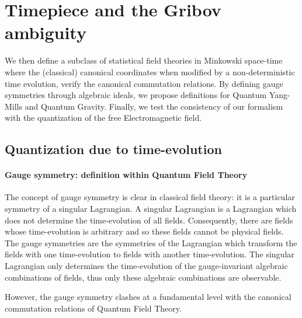 \documentclass[11pt]{book}
\begin{document}
\hypertarget{r4125921756}{%
\subsubsection*{}\label{r4125921756}}

\chapter{Timepiece and the Gribov ambiguity}
We then define a subclass of statistical field theories in Minkowski
space-time where the (classical) canonical coordinates when modified by
a non-deterministic time evolution, verify the canonical commutation
relations. By defining gauge symmetries through algebraic ideals, we
propose definitions for Quantum Yang-Mills and Quantum Gravity. Finally,
we test the consistency of our formalism with the quantization of the
free Electromagnetic field.

\hypertarget{quantization-due-to-time-evolution}{%
\section{Quantization due to
time-evolution}\label{quantization-due-to-time-evolution}}

\hypertarget{gauge-symmetry-definition-within-quantum-field-theory}{%
\subsubsection{Gauge symmetry: definition within Quantum Field
Theory}\label{gauge-symmetry-definition-within-quantum-field-theory}}

The concept of gauge symmetry is clear in classical field theory: it is
a particular symmetry of a singular Lagrangian. A singular Lagrangian is
a Lagrangian which does not determine the time-evolution of all fields.
Consequently, there are fields whose time-evolution is arbitrary and so
these fields cannot be physical fields. The gauge symmetries are the
symmetries of the Lagrangian which transform the fields with one
time-evolution to fields with another time-evolution. The singular
Lagrangian only determines the time-evolution of the gauge-invariant
algebraic combinations of fields, thus only these algebraic combinations
are observable.

However, the gauge symmetry clashes at a fundamental level with the
canonical commutation relations of Quantum Field Theory.
\end{document}
